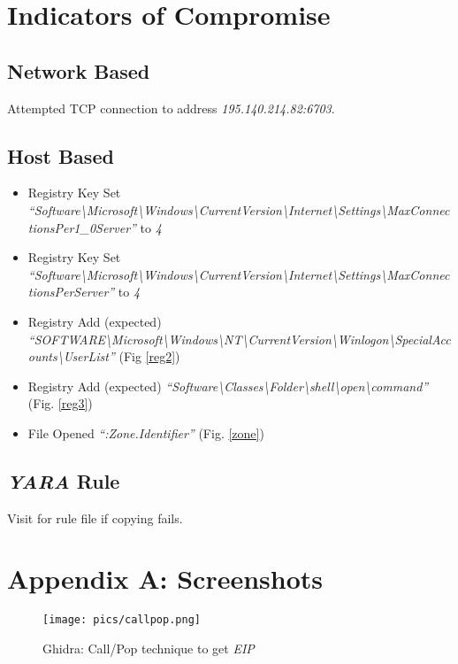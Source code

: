 \documentclass[10pt,a4paper]{article}
\begin{document}
\newpage

\section{Indicators of Compromise}
			\subsection{Network Based}
			Attempted TCP connection to address \textit{195.140.214.82:6703}.
			\subsection{Host Based}
			\begin{itemize}
				\item Registry Key Set \textit{``Software\textbackslash Microsoft\textbackslash Windows\textbackslash CurrentVersion\textbackslash Internet\textbackslash Settings\textbackslash MaxConnectionsPer1\_0Server''} to \textit{4}
				\item Registry Key Set \textit{``Software\textbackslash Microsoft\textbackslash Windows\textbackslash CurrentVersion\textbackslash Internet\textbackslash Settings\textbackslash MaxConnectionsPerServer''} to \textit{4}
				\item Registry Add (expected) \textit{``SOFTWARE\textbackslash Microsoft\textbackslash Windows\textbackslash NT\textbackslash CurrentVersion\textbackslash Winlogon\textbackslash SpecialAccounts\textbackslash UserList''} (Fig \ref{reg2})
				\item Registry Add (expected) \textit{``Software\textbackslash Classes\textbackslash Folder\textbackslash shell\textbackslash open\textbackslash command''} (Fig. \ref{reg3})
				\item File Opened \textit{``:Zone.Identifier''} (Fig. \ref{zone})
			\end{itemize}
			\subsection{\textit{YARA} Rule}
			Visit \cite{ghub} for rule file if copying fails.

\newpage
\section{Appendix A: Screenshots}
\begin{figure}[!htbp]%
	\centering
	\texttt{[image: pics/callpop.png]}
	\caption{Ghidra: Call/Pop technique to get \textit{EIP}}
	\label{callpop}
\end{figure}
\end{document}
